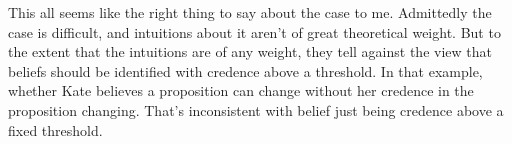 This all seems like the right thing to say about the case to me. Admittedly the case is difficult, and intuitions about it aren't of great theoretical weight. But to the extent that the intuitions are of any weight, they tell against the view that beliefs should be identified with credence above a threshold. In that example, whether Kate believes a proposition can change without her credence in the proposition changing. That's inconsistent with belief just being credence above a fixed threshold.